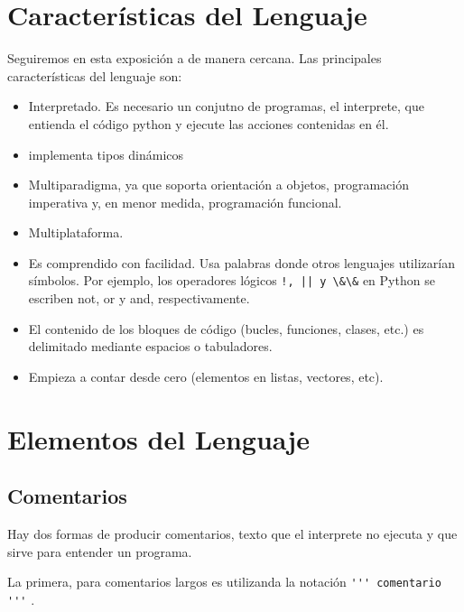 \section{Características del Lenguaje}

Seguiremos en esta exposición a \cite{wiki_python} de manera cercana. Las principales características del lenguaje son:

\begin{itemize}
\item Interpretado. Es necesario un conjutno de programas, el interprete, que entienda el código python y ejecute las acciones contenidas en él.
\item implementa  tipos dinámicos
\item  Multiparadigma, ya que soporta orientación a objetos, programación imperativa y, en menor medida, programación funcional.
\item Multiplataforma.

\item Es comprendido  con facilidad. Usa  palabras donde otros lenguajes utilizarían símbolos. Por ejemplo, los operadores lógicos \verb~!, || y \&\&~ en Python se escriben not, or y and, respectivamente.


\item  El contenido de los bloques de código (bucles, funciones, clases, etc.) es delimitado mediante espacios o tabuladores.

\item Empieza a contar desde cero (elementos en listas, vectores, etc).



\end{itemize}




\section{Elementos del Lenguaje}

\subsection{Comentarios}

Hay dos formas de producir comentarios, texto que el interprete  no ejecuta y que sirve para entender un programa.

La primera, para comentarios largos es utilizanda la notación \linebreak\verb~''' comentario '''~ .


